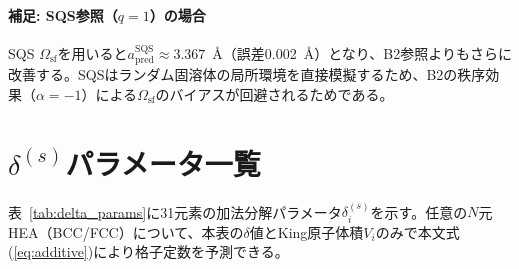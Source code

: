\documentclass[5p,10pt]{elsarticle}
\begin{document}
\paragraph{補足: SQS参照（$q = 1$）の場合}
SQS $\Omega_\text{sf}$を用いると$a_\text{pred}^{\text{SQS}} \approx 3.367$~\AA{}（誤差0.002~\AA）となり、B2参照よりもさらに改善する。SQSはランダム固溶体の局所環境を直接模擬するため、B2の秩序効果（$\alpha = -1$）による$\Omega_\text{sf}$のバイアスが回避されるためである。


\section{$\delta^{(s)}$パラメータ一覧}
\label{sec:appendix_delta}

表~\ref{tab:delta_params}に31元素の加法分解パラメータ$\delta_i^{(s)}$を示す。任意の$N$元HEA（BCC/FCC）について、本表の$\delta$値とKing原子体積$V_i$のみで本文式(\ref{eq:additive})により格子定数を予測できる。
\end{document}
